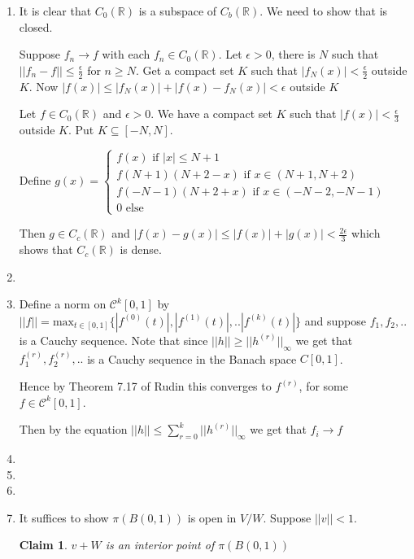 \documentclass{article}
\newtheorem*{claim}{Claim}
\begin{document}
\begin{enumerate}
    \item It is clear that $C_0(\mathbb{R})$ is a subspace of $C_b(\mathbb{R})$. We need to show that is closed.

    Suppose $f_n \to f$ with each $f_n \in C_0(\mathbb{R})$. Let $\epsilon > 0$, there is $N$ such that $||f_n-f|| \leq \frac{\epsilon}{2}$ for $n \geq N$. Get a compact set $K$ such that $|f_N(x)|<\frac{\epsilon}{2}$ outside $K$. Now $|f(x)| \leq |f_N(x)|+|f(x)-f_N(x)| < \epsilon$ outside $K$

    Let $f \in C_0(\mathbb{R})$ and $\epsilon > 0$. We have a compact set $K$ such that $|f(x)|< \frac{\epsilon}{3}$ outside $K$. Put $K \subseteq [-N,N]$. 
    
    Define $g(x)=\begin{cases}
        f(x) \text{ if } |x| \leq N+1 \\
        f(N+1)(N+2-x) \text{ if } x \in (N+1,N+2) \\
        f(-N-1)(N+2+x) \text{ if } x \in (-N-2,-N-1) \\
        0 \text{ else }
    \end{cases}$

    Then $g \in C_c(\mathbb{R})$ and $|f(x)-g(x)| \leq |f(x)|+|g(x)|<\frac{2\epsilon}{3}$ which shows that $C_c(\mathbb{R})$ is dense.

    \item 

    \item Define a norm on $\mathcal{C}^k[0,1]$ by $||f|| = \text{max}_{t \in [0,1]}\{|f^{(0)}(t)|,|f^{(1)}(t)|,..|f^{(k)}(t)|\}$ and suppose $f_1,f_2,..$ is a Cauchy sequence. Note that since $||h|| \geq ||h^{(r)}||_\infty$ we get that $f_1^{(r)},f_2^{(r)},..$ is a Cauchy sequence in the Banach space $C[0,1]$. 
    
    Hence by Theorem 7.17 of Rudin this converges to $f^{(r)}$, for some $f \in \mathcal{C}^k[0,1]$. 
    
    Then by the equation $||h|| \leq \sum_{r=0}^k||h^{(r)}||_\infty$ we get that $f_i \to f$

    \item 
    \item 
    \item 

    \item It suffices to show $\pi(B(0,1))$ is open in $V/W$. Suppose $||v||<1$. 

    \begin{claim}
        $v+W$ is an interior point of $\pi(B(0,1))$
    \end{claim}
    

\end{enumerate}
\end{document}
